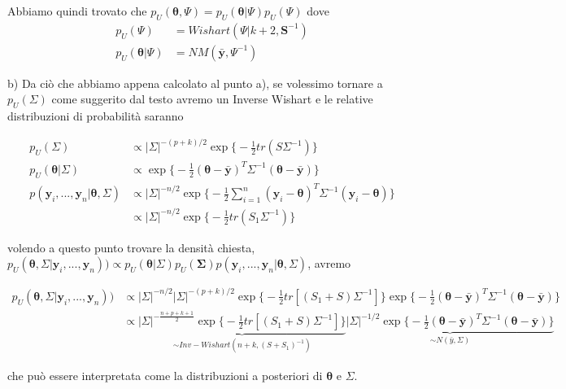 Abbiamo quindi trovato che $p_{U}(\boldsymbol{\theta},\Psi) = p_{U}(\boldsymbol{\theta}|\Psi)p_{U}(\Psi)$ dove 
\begin{align*}
p_{U}(\Psi) &= Wishart(\Psi| k+2, \textbf{S}^{-1}) \\ p_{U}(\boldsymbol{\theta}|\Psi) &= NM(\bar{\textbf{y}},\Psi^{-1})
\end{align*}


b) Da ciò che abbiamo appena calcolato al punto a), se volessimo tornare a $p_U(\Sigma)$ come suggerito dal testo avremo un Inverse Wishart e le relative distribuzioni di probabilità saranno

\begin{align*}
p_{U}(\Sigma) &\propto |\Sigma|^{-(p+k)/2}\exp\Big\{-\frac{1}{2}tr(S\Sigma^{-1})\Big\}\\
p_{U}(\boldsymbol{\theta}|\Sigma) &\propto \exp\Big\{-\frac{1}{2}(\boldsymbol{\theta} - \bar{\textbf{y}})^T\Sigma^{-1}(\boldsymbol{\theta}- \bar{\textbf{y}})\Big\}\\
p(\textbf{y}_i,...,\textbf{y}_n|\boldsymbol{\theta},\Sigma) &\propto |\Sigma|^{-n/2}\exp\Big\{-\frac{1}{2}\sum_{i=1}^n(\textbf{y}_i-\boldsymbol{\theta})^T\Sigma^{-1}(\textbf{y}_i-\boldsymbol{\theta})\Big\} \\
&\propto |\Sigma|^{-n/2}\exp\Big\{-\frac{1}{2}tr(S_1\Sigma^{-1})\Big\}
\end{align*}

volendo a questo punto trovare la densità chiesta, $p_U(\boldsymbol{\theta},\Sigma|\textbf{y}_i,...,\textbf{y}_n)) \propto p_U(\boldsymbol{\theta}|\Sigma)p_U(\boldsymbol{\Sigma})p(\textbf{y}_i,...,\textbf{y}_n|\boldsymbol{\theta},\Sigma)$, avremo

\begin{align*}
p_U(\boldsymbol{\theta},\Sigma|\textbf{y}_i,...,\textbf{y}_n)) &\propto |\Sigma|^{-n/2}|\Sigma|^{-(p+k)/2}\exp\Big\{-\frac{1}{2}tr[(S_1+S)\Sigma^{-1}] \Big\} \exp\Big\{-\frac{1}{2}(\boldsymbol{\theta} - \bar{\textbf{y}})^T\Sigma^{-1}(\boldsymbol{\theta}- \bar{\textbf{y}})\Big\}\\
&\propto \underbrace{|\Sigma|^{-\frac{n+p+k+1}{2}}\exp\Big\{-\frac{1}{2}tr[(S_1+S)\Sigma^{-1}] \Big\}}_\text{$\sim Inv-Wishart(n+k,(S+S_1)^{-1})$} \underbrace{|\Sigma|^{-1/2}\exp\Big\{-\frac{1}{2}(\boldsymbol{\theta} - \bar{\textbf{y}})^T\Sigma^{-1}(\boldsymbol{\theta}- \bar{\textbf{y}})\Big\}}_\text{$\sim N(\bar{y},\Sigma)$}
\end{align*}

che può essere interpretata come la distribuzioni a posteriori di $\boldsymbol{\theta}$ e $\Sigma$.
